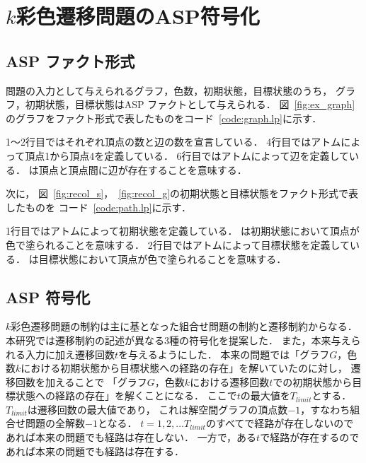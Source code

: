 \chapter{$k$彩色遷移問題のASP符号化} \label{chap:proposal}

\section{ASP ファクト形式}
問題の入力として与えられるグラフ，色数，初期状態，目標状態のうち，
グラフ，初期状態，目標状態はASP ファクトとして与えられる．
図~\ref{fig:ex_graph}のグラフをファクト形式で表したものをコード~\ref{code:graph.lp}に示す．



1～2行目ではそれぞれ頂点の数と辺の数を宣言している．
4行目ではアトムによって頂点1から頂点4を定義している．
6行目ではアトムによって辺を定義している．
は頂点と頂点間に辺が存在することを意味する．

次に， 図~\ref{fig:recol_s}，~\ref{fig:recol_g}の初期状態と目標状態をファクト形式で表したものを
コード~\ref{code:path.lp}に示す．



1行目ではアトムによって初期状態を定義している．
は初期状態において頂点が色で塗られることを意味する．
2行目ではアトムによって目標状態を定義している．
は目標状態において頂点が色で塗られることを意味する．

\section{ASP 符号化}
$k$彩色遷移問題の制約は主に基となった組合せ問題の制約と遷移制約からなる．
本研究では遷移制約の記述が異なる3種の符号化を提案した．
また，本来与えられる入力に加え遷移回数$t$を与えるようにした．
本来の問題では「グラフ$G$，色数$k$における初期状態から目標状態への経路の存在」を解いていたのに対し，
遷移回数を加えることで
「グラフ$G$，色数$k$における遷移回数$t$での初期状態から目標状態への経路の存在」を解くことになる．
ここで$t$の最大値を$T_{limit}$とする．
$T_{limit}$は遷移回数の最大値であり，
これは解空間グラフの頂点数$-1$，すなわち組合せ問題の全解数$-1$となる．
$t=1, 2, \dots T_{limit}$のすべてで経路が存在しないのであれば本来の問題でも経路は存在しない．
一方で，ある$t$で経路が存在するのであれば本来の問題でも経路は存在する．


